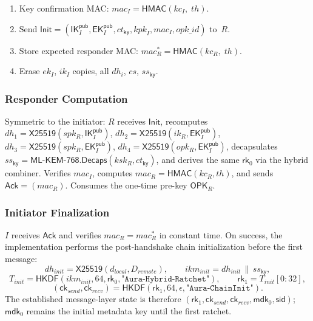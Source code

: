 \documentclass[11pt,a4paper]{article}
\theoremstyle{definition}
\theoremstyle{remark}
\newcommand{\HKDF}{\mathsf{HKDF}}
\newcommand{\HMAC}{\mathsf{HMAC}}
\renewcommand{\DH}{\mathsf{X25519}}
\newcommand{\KEM}{\mathsf{ML\text{-}KEM\text{-}768}}
\newcommand{\Decaps}{\mathsf{Decaps}}
\newcommand{\IK}{\mathsf{IK}}
\newcommand{\EK}{\mathsf{EK}}
\newcommand{\OPK}{\mathsf{OPK}}
\newcommand{\rk}{\mathsf{rk}}
\newcommand{\ck}{\mathsf{ck}}
\newcommand{\mdk}{\mathsf{mdk}}
\newcommand{\sid}{\mathsf{sid}}
\newcommand{\concat}{\,\|\,}
\begin{document}
\begin{enumerate}[nosep]
  \begin{multline*}
    \mathit{Init}_0 = \mathit{Init}\text{ with }\mathit{key\_confirmation\_mac}=\epsilon,\\
    \mathit{th} = \HMAC\bigl(\texttt{"Aura-Handshake-Transcript"},\;
    \mathsf{LP}(\mathsf{Bundle}_R) \concat \mathsf{LP}(\mathit{Init}_0)\bigr).
  \end{multline*}
  \item Key confirmation MAC: $\mathit{mac}_I = \HMAC(\mathit{kc}_I,\; \mathit{th})$.
  \item Send $\mathsf{Init} = (\IK_I^{\mathsf{pub}}, \EK_I^{\mathsf{pub}},
    \mathit{ct}_{\mathsf{ky}}, \mathit{kpk}_I, \mathit{mac}_I, \mathit{opk\_id})$ to~$R$.
  \item Store expected responder MAC: $\mathit{mac}_R^{*} = \HMAC(\mathit{kc}_R,\; \mathit{th})$.
  \item Erase $ek_I$, $ik_I$ copies, all $\mathit{dh}_i$, $\mathit{cs}$, $\mathit{ss}_{\mathsf{ky}}$.
\end{enumerate}

\subsubsection{Responder Computation}

Symmetric to the initiator: $R$ receives $\mathsf{Init}$, recomputes
$\mathit{dh}_1 = \DH(spk_R, \IK_I^{\mathsf{pub}})$,
$\mathit{dh}_2 = \DH(ik_R, \EK_I^{\mathsf{pub}})$,
$\mathit{dh}_3 = \DH(spk_R, \EK_I^{\mathsf{pub}})$,
$\mathit{dh}_4 = \DH(opk_R, \EK_I^{\mathsf{pub}})$,
decapsulates $\mathit{ss}_{\mathsf{ky}} = \KEM.\Decaps(\mathit{ksk}_R, \mathit{ct}_{\mathsf{ky}})$,
and derives the same $\rk_0$ via the hybrid combiner.  Verifies $\mathit{mac}_I$,
computes $\mathit{mac}_R = \HMAC(\mathit{kc}_R, \mathit{th})$, and sends
$\mathsf{Ack} = (\mathit{mac}_R)$.  Consumes the one-time pre-key $\OPK_R$.

\subsubsection{Initiator Finalization}

$I$ receives $\mathsf{Ack}$ and verifies $\mathit{mac}_R = \mathit{mac}_R^{*}$
in constant time. On success, the implementation performs the post-handshake
chain initialization before the first message:
\[
  \mathit{dh}_{\mathit{init}}=\DH(d_{\mathit{local}},D_{\mathit{remote}}),
  \qquad
  \mathit{ikm}_{\mathit{init}}=\mathit{dh}_{\mathit{init}}\concat\mathit{ss}_{\mathsf{ky}},
\]
\[
  T_{\mathit{init}}=\HKDF(\mathit{ikm}_{\mathit{init}},64,\rk_0,\texttt{"Aura-Hybrid-Ratchet"}),
  \qquad
  \rk_1=T_{\mathit{init}}[0{:}32],
\]
\[
  (\ck_{\mathit{send}},\ck_{\mathit{recv}})
    =\HKDF(\rk_1,64,\epsilon,\texttt{"Aura-ChainInit"}).
\]
The established message-layer state is therefore
$(\rk_1,\ck_{\mathit{send}},\ck_{\mathit{recv}},\mdk_0,\sid)$; $\mdk_0$
remains the initial metadata key until the first ratchet.
\end{document}
